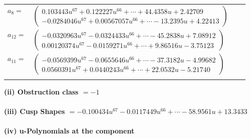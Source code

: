 \documentclass[1p]{elsarticle_modified}
\theoremstyle{definition}
\begin{document}
\begin{tabular}{m{7pt} m{180pt} m{7pt} m{180pt} }
\flushright $a_{8}=$&$\begin{pmatrix}0.103443 u^{67}+0.122227 u^{66}+\cdots+44.4358 u+2.42709\\-0.0284046 u^{67}+0.00567057 u^{66}+\cdots-13.2395 u+4.22413\end{pmatrix}$ \\
\flushright $a_{12}=$&$\begin{pmatrix}-0.0320963 u^{67}-0.0324433 u^{66}+\cdots-45.2838 u+7.08912\\0.00120374 u^{67}-0.0159271 u^{66}+\cdots+9.86516 u-3.75123\end{pmatrix}$ \\
\flushright $a_{11}=$&$\begin{pmatrix}-0.0569399 u^{67}-0.0655646 u^{66}+\cdots-37.3182 u-4.99682\\0.0560391 u^{67}+0.0440243 u^{66}+\cdots+22.0532 u-5.21740\end{pmatrix}$\\&\end{tabular}
\flushleft \textbf{(ii) Obstruction class $= -1$}\\~\\
\flushleft \textbf{(iii) Cusp Shapes $= -0.100434 u^{67}-0.0117449 u^{66}+\cdots-58.9561 u+13.3433$}\\~\\
\newpage\renewcommand{\arraystretch}{1}
\flushleft \textbf{(iv) u-Polynomials at the component}\newline \\
\end{document}
